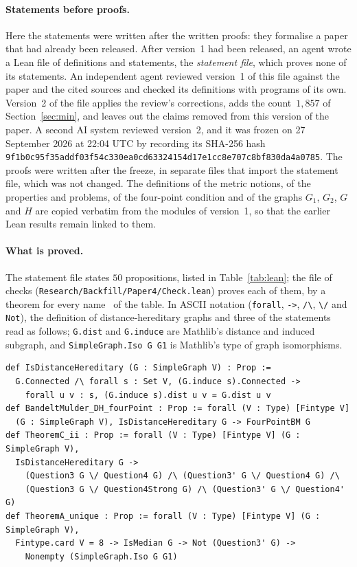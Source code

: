 \documentclass[11pt]{article}
\theoremstyle{remark}
\begin{document}
\paragraph{Statements before proofs.}
Here the statements were written after the written proofs: they formalise a
paper that had already been released. After version~1 had been released, an
agent wrote a Lean file of definitions and statements, the \emph{statement
file}, which proves none of its statements. An independent agent reviewed version~1 of
this file against the paper and the cited sources and checked its
definitions with programs of its own. Version~2 of the file applies the
review's corrections, adds the count~$1{,}857$ of Section~\ref{sec:min}, and
leaves out the claims removed from this version of the paper. A second AI
system reviewed version~2, and it was frozen on 27 September 2026 at 22:04
UTC by recording its SHA-256 hash
\texttt{9f1b0c95f35addf03f54c330ea0cd63324154d17e1cc8e707c8bf830da4a0785}.
The proofs were written after the freeze, in separate files that import the
statement file, which was not changed. The definitions of the metric
notions, of the properties and problems, of the four-point condition and of
the graphs $G_1$, $G_2$, $G$ and $H$ are copied verbatim from the modules of
version~1, so that the earlier Lean results remain linked to them.

\paragraph{What is proved.}
The statement file states $50$ propositions, listed in
Table~\ref{tab:lean}; the file of checks
(\texttt{Research/Backfill/Paper4/Check.lean}) proves each of them, by a
theorem  for every name~ of the table.
In ASCII notation (\texttt{forall}, \texttt{->}, \verb|/\|, \verb|\/| and
\texttt{Not}), the definition of distance-hereditary graphs and three of
the statements read as follows; \texttt{G.dist} and \texttt{G.induce} are
Mathlib's distance and induced subgraph, and \verb|SimpleGraph.Iso G G1| is
Mathlib's type of graph isomorphisms.
\begin{footnotesize}
\begin{verbatim}
def IsDistanceHereditary (G : SimpleGraph V) : Prop :=
  G.Connected /\ forall s : Set V, (G.induce s).Connected ->
    forall u v : s, (G.induce s).dist u v = G.dist u v
def BandeltMulder_DH_fourPoint : Prop := forall (V : Type) [Fintype V]
  (G : SimpleGraph V), IsDistanceHereditary G -> FourPointBM G
def TheoremC_ii : Prop := forall (V : Type) [Fintype V] (G : SimpleGraph V),
  IsDistanceHereditary G ->
    (Question3 G \/ Question4 G) /\ (Question3' G \/ Question4 G) /\
    (Question3 G \/ Question4Strong G) /\ (Question3' G \/ Question4' G)
def TheoremA_unique : Prop := forall (V : Type) [Fintype V] (G : SimpleGraph V),
  Fintype.card V = 8 -> IsMedian G -> Not (Question3' G) ->
    Nonempty (SimpleGraph.Iso G G1)
\end{verbatim}
\end{footnotesize}
\end{document}
